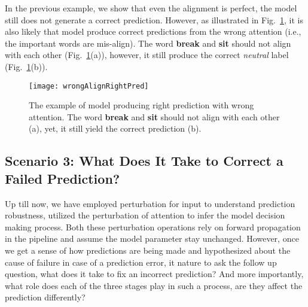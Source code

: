 In the previous example, we show that even the alignment is perfect, the model still does not generate a correct prediction.
However, as illustrated in Fig.~\ref{fig:wrongAlignRightPred}, it is also likely that model produce correct predictions from the wrong attention (i.e., the important words are mis-align). The word \textbf{break} and \textbf{sit} should not align with each other (Fig.~\ref{fig:wrongAlignRightPred}(a)), however, it still produce the correct \emph{neutral} label (Fig.~\ref{fig:wrongAlignRightPred}(b)).

\begin{figure}[htbp]
\centering
\vspace{-2mm}
 \texttt{[image: wrongAlignRightPred]}
 \caption{
The example of model producing right prediction with wrong attention.
The word \textbf{break} and \textbf{sit} should not align with each other (a), yet, it still yield the correct prediction (b).
}
\label{fig:wrongAlignRightPred}
\end{figure}






\subsection{Scenario 3: What Does It Take to Correct a Failed Prediction?}
Up till now, we have employed perturbation for input to understand prediction robustness, utilized the perturbation of attention to infer the model decision making process. Both these perturbation operations rely on forward propagation in the pipeline and assume the model parameter stay unchanged.
%
However, once we get a sense of how predictions are being made and hypothesized about the cause of failure in case of a prediction error, it nature to ask the follow up question, what does it take to fix an incorrect prediction? And more importantly, what role does each of the three stages play in such a process, are they affect the prediction differently?

